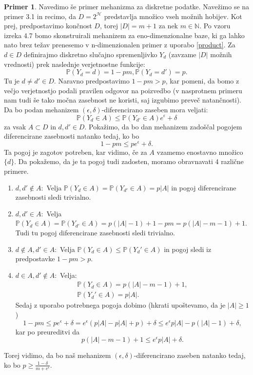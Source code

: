 \documentclass[12pt,a4paper]{amsart}
\theoremstyle{definition} %
\newtheorem{primer}[definicija]{Primer}
\theoremstyle{plain} %
\begin{document}
\begin{primer}
Navedimo še primer mehanizma za diskretne podatke. Navežimo se na primer 3.1 in recimo, da $D=2^{\mathcal{H}}$ predstavlja množico vseh možnih hobijev. Kot prej, predpostavimo končnost $D$, torej $|D| = m + 1$ za nek $m \in \mathbb{N}$. Po vzoru izreka 4.7 bomo skonstruirali mehanizem za eno-dimenzionalne baze, ki ga lahko nato brez težav prenesemo v n-dimenzionalen primer z uporabo \eqref{product}.
\newline
\newline
Za $d \in D$ definirajmo diskretno slučajno spremenljivko $Y_d$ (zavzame $|D|$ možnih vrednosti) prek naslednje verjetnostne funkcije:
$$\mathbb{P}(Y_d=d) = 1 - pm, \mathbb{P}(Y_d=d') = p.$$
Tu je $d \neq d' \in D$. Naravno predpostavimo $1 - pm > p$, kar pomeni, da bomo z večjo verjetnostjo podali pravilen odgovor na poizvedbo (v nasprotnem primeru nam tudi še tako močna zasebnost ne koristi, saj izgubimo preveč natančnosti).
\newline
\newline
Da bo podan mehanizem $(\epsilon, \delta)$-diferencirano zaseben mora veljati:
\begin{equation}
\mathbb{P}(Y_d \in A) \leq \mathbb{P}(Y_{d'} \in A)e^{\epsilon} + \delta
\end{equation}
za vsak $A \subset D$ in $d, d' \in D$.
\newline
\newline
Pokažimo, da bo dan mehanizem zadoščal pogojem diferencirane zasebnosti natanko tedaj, ko bo $$1 - pm \leq pe^{\epsilon} + \delta.$$ Ta pogoj je zagotov potreben, kar vidimo, če za $A$ vzamemo enostavno množico $\{d\}$. Da pokažemo, da je ta pogoj tudi zadosten, moramo obravnavati 4 različne primere.
\begin{enumerate}
\item $d,d' \notin A: $ Velja $\mathbb{P}(Y_d \in A) = \mathbb{P}(Y_{d'} \in A)= p|A|$ in pogoj diferencirane zasebnosti sledi trivialno.
\item $d,d' \in A: $ Velja $\mathbb{P}(Y_d \in A) = \mathbb{P}(Y_{d'} \in A) = p(|A| - 1) + 1 - pm=p(|A| -m -1) + 1$. Tudi tu pogoj diferencirane zasebnosti sledi trivialno.
\item $d \notin A,d' \in A: $ Velja $\mathbb{P}(Y_d \in A) \leq \mathbb{P}(Y_d' \in A)$ in pogoj sledi iz predpostavke $1 - pm > p$.
\item  $d \in A, d' \notin A: $ Velja:
\begin{gather*}
\mathbb{P}(Y_d \in A) = p(|A| -m -1) + 1, \\
\mathbb{P}(Y_d' \in A) = p|A|.
\end{gather*}
Sedaj z uporabo potrebnega pogoja dobimo (hkrati upoštevamo, da je $|A| \geq 1$)
$$1-pm\leq pe^{\epsilon} + \delta = e^{\epsilon}(p|A|-p|A|+p)+\delta \leq e^{\epsilon}p|A|-p(|A|-1)+\delta,$$
kar po preureditvi da 
$$p(|A| -m -1) + 1 \leq e^{\epsilon}p|A| + \delta.$$
\end{enumerate}
Torej vidimo, da bo naš mehanizem $(\epsilon, \delta)$-diferencirano zaseben natanko tedaj, ko bo $p \geq \frac{1-\delta}{m+e^{\epsilon}}$.

\end{primer}
\end{document}

